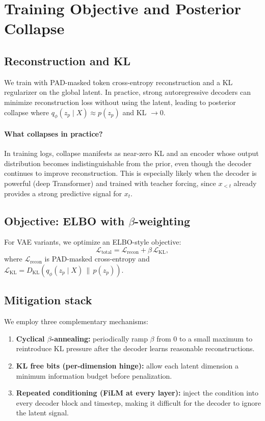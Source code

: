 \documentclass[10pt]{article}
\begin{document}
\section{Training Objective and Posterior Collapse}
\subsection{Reconstruction and KL}
We train with PAD-masked token cross-entropy reconstruction and a KL regularizer on the global latent. In practice, strong autoregressive decoders can minimize reconstruction loss without using the latent, leading to posterior collapse where $q_\phi(z_p\mid X)\approx p(z_p)$ and KL $\to 0$.

\paragraph{What collapses in practice?}
In training logs, collapse manifests as near-zero KL and an encoder whose output distribution becomes indistinguishable from the prior, even though the decoder continues to improve reconstruction. This is especially likely when the decoder is powerful (deep Transformer) and trained with teacher forcing, since $x_{<t}$ already provides a strong predictive signal for $x_t$.

\subsection{Objective: ELBO with $\beta$-weighting}
For VAE variants, we optimize an ELBO-style objective:
\[
  \mathcal{L}_{\text{total}} = \mathcal{L}_{\text{recon}} + \beta\, \mathcal{L}_{\text{KL}},
\]
where $\mathcal{L}_{\text{recon}}$ is PAD-masked cross-entropy and $\mathcal{L}_{\text{KL}} = D_{\text{KL}}(q_\phi(z_p\mid X)\,\|\,p(z_p))$.

\subsection{Mitigation stack}
We employ three complementary mechanisms:
\begin{enumerate}[leftmargin=*,itemsep=0pt]
  \item \textbf{Cyclical $\beta$-annealing:} periodically ramp $\beta$ from 0 to a small maximum to reintroduce KL pressure after the decoder learns reasonable reconstructions.
  \item \textbf{KL free bits (per-dimension hinge):} allow each latent dimension a minimum information budget before penalization.
  \item \textbf{Repeated conditioning (FiLM at every layer):} inject the condition into every decoder block and timestep, making it difficult for the decoder to ignore the latent signal.
\end{enumerate}
\end{document}
